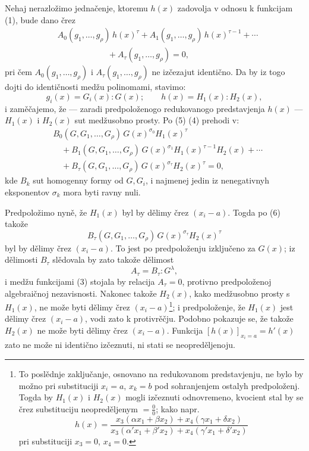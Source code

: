 \documentclass[11pt]{article}
\begin{document}
Nehaj nerazložimo jednačenje, ktoremu $h(x)$ zadovolja v odnosu k funkcijam (1), bude dano črez
\begin{equation}
\begin{aligned}
&A_0(g_1,\ldots,g_\rho)\,h(x)^\tau
 +A_1(g_1,\ldots,g_\rho)\,h(x)^{\tau-1}
 +\cdots \\
&\hspace{6em}+A_\tau(g_1,\ldots,g_\rho)=0,
\end{aligned}
\tag{4}
\end{equation}
pri čem $A_0(g_1,\ldots,g_\rho)$ i $A_\tau(g_1,\ldots,g_\rho)$ ne izčezajut identično. Da by iz togo dojti do identičnosti medžu polinomami, stavimo:
\begin{equation}
  g_i(x)=G_i(x):G(x);\qquad h(x)=H_1(x):H_2(x),
\tag{5}
\end{equation}
i zaměčajemo, že --- zaradi predpoloženogo redukovanogo predstavjenja $h(x)$ --- $H_1(x)$ i $H_2(x)$ sut medžusobno prosty. Po (5) (4) prehodi v:
\begin{equation}
\begin{aligned}
&B_0(G,G_1,\ldots,G_\rho)\,G(x)^{\sigma_0}H_1(x)^\tau \\
&\quad+B_1(G,G_1,\ldots,G_\rho)\,G(x)^{\sigma_1}H_1(x)^{\tau-1}H_2(x)+\cdots \\
&\quad+B_\tau(G,G_1,\ldots,G_\rho)\,G(x)^{\sigma_\tau}H_2(x)^\tau=0,
\end{aligned}
\tag{6}
\end{equation}
kde $B_k$ sut homogenny formy od $G,G_i$, i najmenej jedin iz nenegativnyh eksponentov $\sigma_k$ mora byti ravny nuli.

Predpoložimo nyně, že $H_1(x)$ byl by dělimy črez $(x_i-a)$. Togda po (6) takože
\[
  B_\tau(G,G_1,\ldots,G_\rho)\,G(x)^{\sigma_\tau}H_2(x)^\tau
\]
byl by dělimy črez $(x_i-a)$. To jest po predpoloženju izključeno za $G(x)$; iz dělimosti $B_\tau$ slědovala by zato takože dělimost
\[
  A_\tau=B_\tau:G^\lambda,
\]
i medžu funkcijami (3) stojala by relacija $A_\tau=0$, protivno predpoloženoj algebraičnoj nezavisnosti. Nakonec takože $H_2(x)$, kako medžusobno prosty s $H_1(x)$, ne može byti dělimy črez $(x_i-a)$\footnote{To poslědnje zaključanje, osnovano na redukovanom predstavjenju, ne bylo by možno pri substituciji $x_i=a$, $x_k=b$ pod sohranjenjem ostalyh predpoloženj. Togda by $H_1(x)$ i $H_2(x)$ mogli izčeznuti odnovremeno, kvocient stal by se črez substituciju neopreděljenym $=\frac{0}{0}$; kako napr.
\[
 h(x)=\frac{x_3(\alpha x_1+\beta x_2)+x_4(\gamma x_1+\delta x_2)}
 {x_3(\alpha' x_1+\beta' x_2)+x_4(\gamma' x_1+\delta' x_2)}
\]
pri substituciji $x_3=0$, $x_4=0$.}; i predpoloženje, že $H_1(x)$ jest dělimy črez $(x_i-a)$, vodi zato k protivrěčju. Podobno pokazuje se, že takože $H_2(x)$ ne može byti dělimy črez $(x_i-a)$. Funkcija $[h(x)]_{x_i=a}=h'(x)$ zato ne može ni identično izčeznuti, ni stati se neopreděljenoju.
\end{document}
